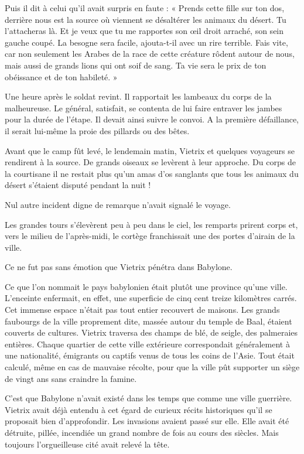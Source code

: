 \documentclass[a4paper, 11pt, oneside, polutonikogreek, french]{article}
\begin{document}
Puis il dit à celui qu'il avait surpris en faute : « Prends cette fille sur ton dos, derrière nous est la source où viennent se désaltérer les animaux du désert. Tu l'attacheras là. Et je veux que tu me rapportes son œil droit arraché, son sein gauche coupé. La besogne sera facile, ajouta-t-il avec un rire terrible. Fais vite, car non seulement les Arabes de la race de cette créature rôdent autour de nous, mais aussi de grands lions qui ont soif de sang. Ta vie sera le prix de ton obéissance et de ton habileté. »

Une heure après le soldat revint. Il rapportait les lambeaux du corps de la malheureuse. Le général, satisfait, se contenta de lui faire entraver les jambes pour la durée de l'étape. Il devait ainsi suivre le convoi. A la première défaillance, il serait lui-même la proie des pillards ou des bêtes.

Avant que le camp fût levé, le lendemain matin, Vietrix et quelques voyageurs se rendirent à la source. De grands oiseaux se levèrent à leur approche. Du corps de la courtisane il ne restait plus qu'un amas d'os sanglants que tous les animaux du désert s'étaient disputé pendant la nuit !

Nul autre incident digne de remarque n'avait signalé le voyage.

\bigskip
\centerline{\EightStarTaper}
\centerline{\EightStarTaper\EightStarTaper}
\bigskip

Les grandes tours s'élevèrent peu à peu dans le ciel, les remparts prirent corps et, vers le milieu de l'après-midi, le cortège franchissait une des portes d'airain de la ville.

Ce ne fut pas sans émotion que Vietrix pénétra dans Babylone.

Ce que l'on nommait le pays babylonien était plutôt une province qu'une ville. L'enceinte enfermait, en effet, une superficie de cinq cent treize kilomètres carrés. Cet immense espace n'était pas tout entier recouvert de maisons. Les grands faubourgs de la ville proprement dite, massée autour du temple de Baal, étaient couverts de cultures. Vietrix traversa des champs de blé, de seigle, des palmeraies entières. Chaque quartier de cette ville extérieure correspondait généralement à une nationalité, émigrants ou captifs venus de tous les coins de l'Asie. Tout était calculé, même en cas de mauvaise récolte, pour que la ville pût supporter un siège de vingt ans sans craindre la famine.

C'est que Babylone n'avait existé dans les temps que comme une ville guerrière. Vietrix avait déjà entendu à cet égard de curieux récits historiques qu'il se proposait bien d'approfondir. Les invasions avaient passé sur elle. Elle avait été détruite, pillée, incendiée un grand nombre de fois au cours des siècles. Mais toujours l'orgueilleuse cité avait relevé la tête.
\end{document}
